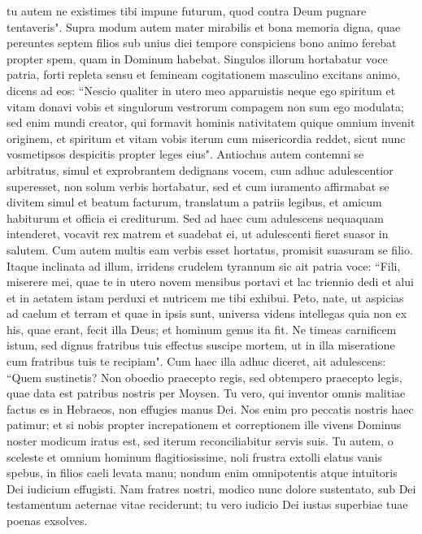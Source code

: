 \begin{biblechapter}
\verse tu autem ne existimes tibi impune futurum, quod contra Deum pugnare tentaveris". 
\verse Supra modum autem mater mirabilis et bona memoria digna, quae pereuntes septem filios sub unius diei tempore conspiciens bono animo ferebat propter spem, quam in Dominum habebat. 
\verse Singulos illorum hortabatur voce patria, forti repleta sensu et femineam cogitationem masculino excitans animo, dicens ad eos: 
\verse “Nescio qualiter in utero meo apparuistis neque ego spiritum et vitam donavi vobis et singulorum vestrorum compagem non sum ego modulata; 
\verse sed enim mundi creator, qui formavit hominis nativitatem quique omnium invenit originem, et spiritum et vitam vobis iterum cum misericordia reddet, sicut nunc vosmetipsos despicitis propter leges eius". 
\verse Antiochus autem contemni se arbitratus, simul et exprobrantem dedignans vocem, cum adhuc adulescentior superesset, non solum verbis hortabatur, sed et cum iuramento affirmabat se divitem simul et beatum facturum, translatum a patriis legibus, et amicum habiturum et officia ei crediturum. 
\verse Sed ad haec cum adulescens nequaquam intenderet, vocavit rex matrem et suadebat ei, ut adulescenti fieret suasor in salutem. 
\verse Cum autem multis eam verbis esset hortatus, promisit suasuram se filio. 
\verse Itaque inclinata ad illum, irridens crudelem tyrannum sic ait patria voce: “Fili, miserere mei, quae te in utero novem mensibus portavi et lac triennio dedi et alui et in aetatem istam perduxi et nutricem me tibi exhibui. 
\verse Peto, nate, ut aspicias ad caelum et terram et quae in ipsis sunt, universa videns intellegas quia non ex his, quae erant, fecit illa Deus; et hominum genus ita fit. 
\verse Ne timeas carnificem istum, sed dignus fratribus tuis effectus suscipe mortem, ut in illa miseratione cum fratribus tuis te recipiam". 
\verse Cum haec illa adhuc diceret, ait adulescens: “Quem sustinetis? Non oboedio praecepto regis, sed obtempero praecepto legis, quae data est patribus nostris per Moysen. 
\verse Tu vero, qui inventor omnis malitiae factus es in Hebraeos, non effugies manus Dei. 
\verse Nos enim pro peccatis nostris haec patimur; 
\verse et si nobis propter increpationem et correptionem ille vivens Dominus noster modicum iratus est, sed iterum reconciliabitur servis suis. 
\verse Tu autem, o sceleste et omnium hominum flagitiosissime, noli frustra extolli elatus vanis spebus, in filios caeli levata manu; 
\verse nondum enim omnipotentis atque intuitoris Dei iudicium effugisti. 
\verse Nam fratres nostri, modico nunc dolore sustentato, sub Dei testamentum aeternae vitae reciderunt; tu vero iudicio Dei iustas superbiae tuae poenas exsolves. 

\end{biblechapter}
